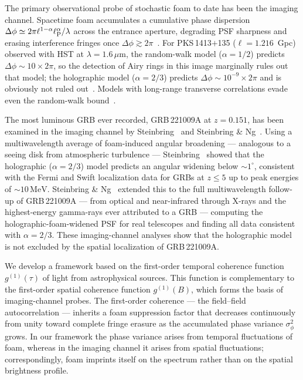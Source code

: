 \documentclass[aps,prd,onecolumn,amsmath,amssymb]{revtex4-2}
\begin{document}
The primary observational probe of stochastic foam to date has been the imaging
channel. Spacetime foam accumulates a cumulative phase dispersion
$\Delta\phi \simeq 2\pi\ell^{1-\alpha}\ell_{\rm P}^{\alpha}/\lambda$ across the
entrance aperture, degrading PSF sharpness and erasing interference fringes once
$\Delta\phi \gtrsim 2\pi$~\cite{LieuHillman2003}.
For PKS\,1413$+$135 ($\ell = 1.216$~Gpc) observed with HST at $\lambda=1.6\,\mu$m,
the random-walk model ($\alpha=1/2$) predicts $\Delta\phi \sim 10\times 2\pi$,
so the detection of Airy rings in this image marginally rules out that model;
the holographic model ($\alpha=2/3$) predicts $\Delta\phi \sim 10^{-9}\times 2\pi$
and is obviously not ruled out~\cite{NgPerlman2022,Christiansen2011,Perlman2015}.
Models with long-range transverse correlations evade even the random-walk
bound~\cite{LeeZurekChen2024}.

The most luminous GRB ever recorded, GRB\,221009A at $z=0.151$, has been
examined in the imaging channel by Steinbring~\cite{Steinbring2023} and
Steinbring \& Ng~\cite{SteinbringNg2026}.
Using a multiwavelength average of foam-induced angular broadening ---
analogous to a seeing disk from atmospheric turbulence ---
Steinbring~\cite{Steinbring2023} showed that the holographic ($\alpha=2/3$)
model predicts an angular widening below $\sim\!1^{\circ}$, consistent
with the Fermi and Swift localization data for GRBs at $z\leq 5$ up to
peak energies of $\sim\!10\,\mathrm{MeV}$.
Steinbring \& Ng~\cite{SteinbringNg2026} extended this to the full
multiwavelength follow-up of GRB\,221009A --- from optical and near-infrared
through X-rays and the highest-energy gamma-rays ever attributed to a GRB ---
computing the holographic-foam-widened PSF for real telescopes and finding all
data consistent with $\alpha=2/3$.
These imaging-channel analyses show that the holographic model is not
excluded by the spatial localization of GRB\,221009A.

We develop a framework based on the first-order temporal coherence
function $g^{(1)}(\tau)$ of light from astrophysical sources.
This function is complementary to the first-order spatial coherence
function $g^{(1)}(B)$, which forms the basis of imaging-channel probes.
The first-order coherence --- the field--field autocorrelation ---
inherits a foam suppression factor
that decreases continuously from unity toward complete fringe erasure as
the accumulated phase variance $\sigma_\phi^2$ grows.
In our framework the phase variance arises from temporal fluctuations of
foam, whereas in the imaging channel it arises from spatial fluctuations;
correspondingly, foam imprints itself on the spectrum rather than on the
spatial brightness profile.
\end{document}
